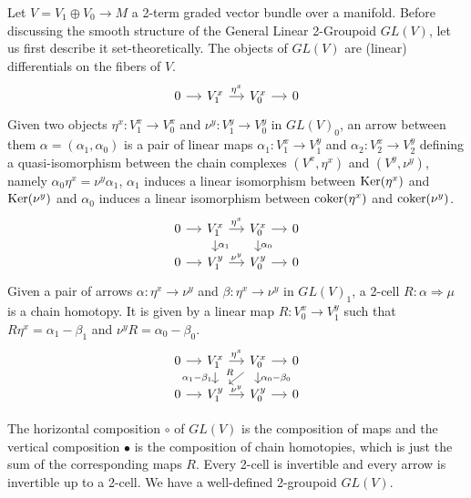 %
%

Let $V=V_1\oplus V_0\to M$ a 2-term graded vector bundle over a manifold.
Before discussing the smooth structure of the General Linear 2-Groupoid $GL(V)$, let us first describe it set-theoretically.
The objects of $GL(V)$ are (linear) differentials on the fibers of $V$.
\begin{equation}
  \begin{tikzcd}[sep=small]
    0 \ar{r} & V_1^x \ar{r}{\eta^x} & V_0^x \ar{r} & 0
  \end{tikzcd}
\end{equation}
Given two objects $\eta^x\colon V_1^x\to V_0^x$ and $\nu^y\colon V_1^y\to V_0^y$ in $GL(V)_0$, an arrow between them $\alpha=(\alpha_1,\alpha_0)$ is a pair of linear maps $\alpha_1\colon V_1^x\to V_1^y$ and $\alpha_2\colon V_2^x\to V_2^y$ defining a quasi-isomorphism between the chain complexes $(V^x,\eta^x)$ and $(V^y,\nu^y)$, namely $\alpha_0\eta^x=\nu^y\alpha_1$, $\alpha_1$ induces a linear isomorphism between $\operatorname{Ker}(\eta^x)$ and $\operatorname{Ker}(\nu^y)$ and $\alpha_0$ induces a linear isomorphism between $\operatorname{coker}(\eta^x)$ and $\operatorname{coker}(\nu^y)$.
\begin{equation}
  \begin{tikzcd}[sep=small]
    0 \ar{r} & V_1^x \ar{r}{\eta^x} \ar{d}{\alpha_1} & V_0^x \ar{r} \ar{d}{\alpha_0} & 0 \\
    0 \ar{r} & V_1^y \ar{r}{\nu^y} & V_0^y \ar{r} & 0
  \end{tikzcd}
\end{equation}
Given a pair of arrows $\alpha\colon\eta^x\to\nu^y$ and $\beta\colon\eta^x\to\nu^y$ in $GL(V)_1$, a 2-cell $R\colon\alpha\Rightarrow\mu$ is a chain homotopy.
It is given by a linear map $R\colon V_0^x\to V_1^y$ such that $R\eta^x=\alpha_1-\beta_1$ and $\nu^y R=\alpha_0-\beta_0$.
\begin{equation}
  \begin{tikzcd}[sep=small]
    0 \ar{r} & V_1^x \ar{r}{\eta^x} \ar[swap]{d}{\alpha_1-\beta_1} & V_0^x \ar{r} \ar{d}{\alpha_0-\beta_0} \ar[swap]{dl}{R} & 0 \\
    0 \ar{r} & V_1^y \ar{r}{\nu^y} & V_0^y \ar{r} & 0
  \end{tikzcd}
\end{equation}

The horizontal composition $\circ$ of $GL(V)$ is the composition of maps and the vertical composition $\bullet$ is the composition of chain homotopies, which is just the sum of the corresponding maps $R$.
Every 2-cell is invertible and every arrow is invertible up to a 2-cell.
We have a well-defined 2-groupoid $GL(V)$.

